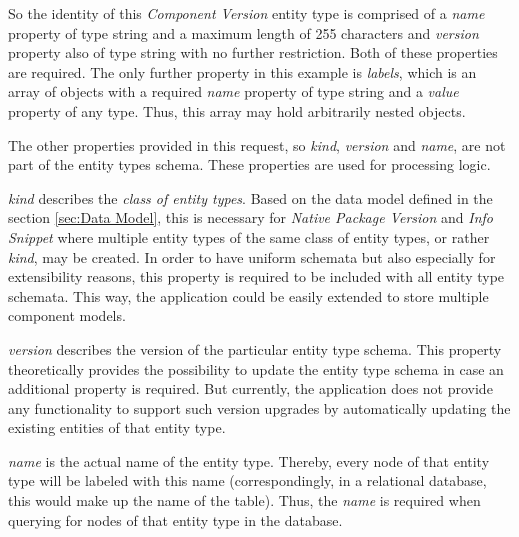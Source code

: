 So the identity of this \emph{Component Version} entity type is comprised of a \emph{name} property of type string and a maximum length of 255 characters and \emph{version} property also of type string with no further restriction. Both of these properties are required. The only further property in this example is \emph{labels}, which is an array of objects with a required \emph{name} property of type string and a \emph{value} property of any type. Thus, this array may hold arbitrarily nested objects.\par 
The other properties provided in this request, so \emph{kind}, \emph{version} and \emph{name}, are not part of the entity types schema. These properties are used for processing logic.\par \emph{kind} describes the \emph{class of entity types}. Based on the data model defined in the section \ref{sec:Data Model}, this is necessary for \emph{Native Package Version} and \emph{Info Snippet} where multiple entity types of the same class of entity types, or rather \emph{kind}, may be created. In order to have uniform schemata but also especially for extensibility reasons, this property is required to be included with all entity type schemata. This way, the application could be easily extended to store multiple component models.\par 
\emph{version} describes the version of the particular entity type schema. This property theoretically provides the possibility to update the entity type schema in case an additional property is required. But currently, the application does not provide any functionality to support such version upgrades by automatically updating the existing entities of that entity type.\par 
\emph{name} is the actual name of the entity type. Thereby, every node of that entity type will be labeled with this name (correspondingly, in a relational database, this would make up the name of the table). Thus, the \emph{name} is required when querying for nodes of that entity type in the database.\\

